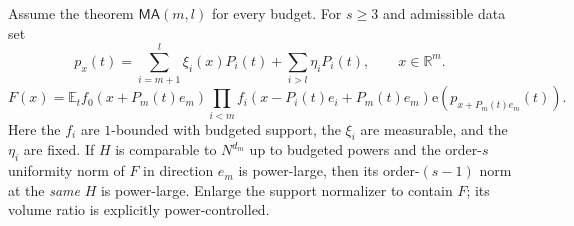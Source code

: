 \documentclass[11pt]{article}
\theoremstyle{definition}
\newcommand{\ee}[1]{\mathrm e\!\left(#1\right)}
\newcommand{\R}{\mathbb R}
\begin{document}
\begin{lemma}\label{patch:conditional-degree}
Assume the theorem $\mathsf{MA}(m,l)$ for every budget.  For $s\geq3$ and admissible data set
\[
 p_x(t)=\sum_{i=m+1}^l\xi_i(x)P_i(t)+\sum_{i>l}\eta_iP_i(t),\qquad x\in\R^m.
\]
\[
 F(x)=\mathbb E_t f_0(x+P_m(t)e_m)
           \prod_{i<m}f_i(x-P_i(t)e_i+P_m(t)e_m)
           \ee{p_{x+P_m(t)e_m}(t)}.
\]
Here the $f_i$ are $1$-bounded with budgeted support, the $\xi_i$ are measurable, and the
$\eta_i$ are fixed.  If $H$ is comparable to $N^{d_m}$ up to budgeted powers and the
order-$s$ uniformity norm of $F$ in direction $e_m$ is power-large, then its order-$(s-1)$
norm at the \emph{same} $H$ is power-large.  Enlarge the support normalizer to contain $F$;
its volume ratio is explicitly power-controlled.
\end{lemma}
\end{document}
